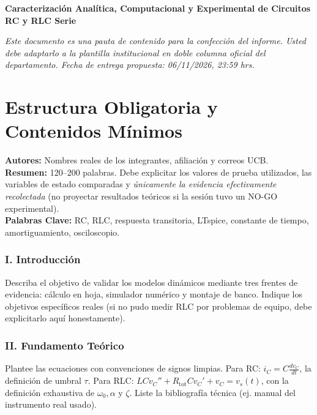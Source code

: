 \documentclass[11pt, a4paper]{article}
\begin{document}
\begin{tcolorbox}[colback=ucbblue!5!white, colframe=ucbblue, title=\textbf{Artefacto A3: Estructura Editorial Compatible IEEE (EC3)}]
    \centering \textbf{Caracterización Analítica, Computacional y Experimental de Circuitos RC y RLC Serie}
\end{tcolorbox}

\noindent\textit{Este documento es una pauta de contenido para la confección del informe. Usted debe adaptarlo a la plantilla institucional en doble columna oficial del departamento. Fecha de entrega propuesta: 06/11/2026, 23:59 hrs.}

\section*{Estructura Obligatoria y Contenidos Mínimos}

\textbf{Autores:} Nombres reales de los integrantes, afiliación y correos UCB. \\
\textbf{Resumen:} 120–200 palabras. Debe explicitar los valores de prueba utilizados, las variables de estado comparadas y \textit{únicamente la evidencia efectivamente recolectada} (no proyectar resultados teóricos si la sesión tuvo un NO-GO experimental).\\
\textbf{Palabras Clave:} RC, RLC, respuesta transitoria, LTspice, constante de tiempo, amortiguamiento, osciloscopio.

\vspace{0.2cm}
\subsubsection*{I. Introducción}
Describa el objetivo de validar los modelos dinámicos mediante tres frentes de evidencia: cálculo en hoja, simulador numérico y montaje de banco. Indique los objetivos específicos reales (si no pudo medir RLC por problemas de equipo, debe explicitarlo aquí honestamente).

\subsubsection*{II. Fundamento Teórico}
Plantee las ecuaciones con convenciones de signos limpias. Para RC: $i_C = C \frac{dv_C}{dt}$, la definición de umbral $\tau$. Para RLC: $LC v_C'' + R_{\text{tot}}C v_C' + v_C = v_s(t)$, con la definición exhaustiva de $\omega_0, \alpha$ y $\zeta$. Liste la bibliografía técnica (ej. manual del instrumento real usado).
\end{document}
